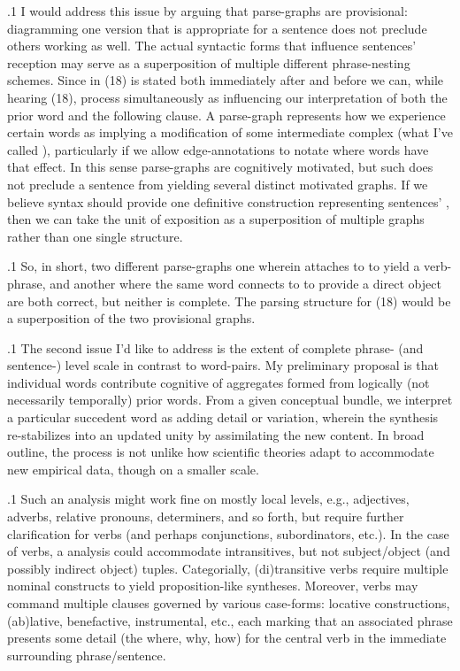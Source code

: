 \documentclass[11pt, twocolumn]{article}
\begin{document}
{{\p.1{%
I would address this issue by arguing that parse-graphs are provisional:
diagramming one version that is appropriate for a sentence does not
preclude others working as well. The actual syntactic forms that
influence sentences' reception may serve as a superposition
of multiple different phrase-nesting schemes. Since 
in \exsRef(18) is stated both immediately after  and before
 we can, while hearing \exsRef(18), process 
simultaneously as influencing our interpretation of both the
prior word and the following clause. A parse-graph represents
how we experience certain words as implying a modification of
some intermediate complex (what I've called ),
particularly if we allow edge-annotations to notate where
words have that  effect.
In this sense parse-graphs are cognitively motivated,
but such does not preclude a sentence from yielding several
distinct motivated graphs. If we believe syntax should
provide one definitive construction representing sentences'
, then we can take the unit of exposition
as a superposition of multiple graphs rather
than one single structure.
}%

\p.1{%
So, in short, two different parse-graphs \mdash{} one wherein  attaches
to  to yield a verb-phrase, and another where the same word
connects to  to provide a direct object \mdash{} are both
correct, but neither is complete. The  parsing
structure for \exsRef(18) would be a superposition of the two provisional graphs.
}%

\p.1{%
The second issue I'd like to address is the extent of complete phrase-
(and sentence-) level scale in contrast to word-pairs.
My preliminary proposal is that individual words contribute
cognitive  of aggregates formed from logically
(not necessarily temporally) prior words. From a
given conceptual bundle, we
interpret a particular succedent word as adding detail or
variation, wherein the synthesis re-stabilizes into
an updated unity by assimilating the new content.
In broad outline, the process is not unlike
how scientific theories adapt to accommodate new
empirical data, though on a smaller scale.
}%

\p.1{%
Such an analysis might work fine on mostly
local levels, e.g., adjectives, adverbs, relative
pronouns, determiners, and so forth, but require
further clarification for verbs (and perhaps conjunctions,
subordinators, etc.). In the case of verbs, a
 analysis could accommodate intransitives,
but not subject/object (and possibly indirect object)
tuples. Categorially, (di)transitive verbs
require multiple nominal constructs to
yield proposition-like syntheses. Moreover,
verbs may command multiple clauses governed
by various case-forms: locative constructions,
(ab)lative, benefactive, instrumental, etc., each marking
that an associated phrase presents some detail
(the where, why, how) for the central verb
in the immediate surrounding phrase/sentence.
}%

}}
\end{document}
